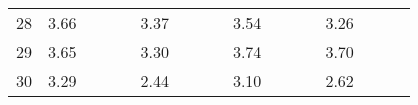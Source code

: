 \begin{center}
\begin{tabular}{| l || c | c | c | c | c | c | c | c | c | c | c | c | c | c | c | c |}
28 & \multirow{1}{*}{ 3.66 }  & & & & \multirow{1}{*}{ 3.37 }  & & & & \multirow{1}{*}{ 3.54 }  & & & & \multirow{1}{*}{ 3.26 }  & & & \\\cline{2-2}\cline{6-6}\cline{10-10}\cline{14-14}
29 & \multirow{1}{*}{ 3.65 }  & & & & \multirow{1}{*}{ 3.30 }  & & & & \multirow{1}{*}{ 3.74 }  & & & & \multirow{1}{*}{ 3.70 }  & & & \\\cline{2-2}\cline{6-6}\cline{10-10}\cline{14-14}
30 & \multirow{1}{*}{ 3.29 }  & & & & \multirow{1}{*}{ 2.44 }  & & & & \multirow{1}{*}{ 3.10 }  & & & & \multirow{1}{*}{ 2.62 }  & & & \\\cline{2-2}\cline{6-6}\cline{10-10}\cline{14-14}\cline{3-3}\cline{7-7}\cline{11-11}\cline{15-15}\cline{4-4}\cline{8-8}\cline{12-12}\cline{16-16}\cline{5-5}\cline{9-9}\cline{13-13}\cline{17-17}
\hline\end{tabular}
\end{center}